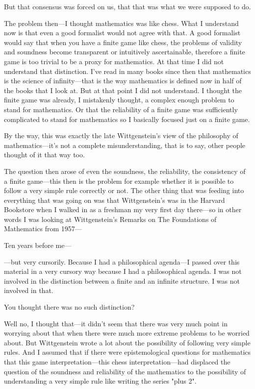  But that consensus was forced on us, that that was what we 
were supposed to do. 

 The problem then---I thought mathematics was like chess. 
What I understand now is that even a good formalist would not agree 
with that. A good formalist would say that when you have a finite game 
like chess, the problems of validity and soundness become transparent 
or intuitively ascertainable, therefore a finite game is too trivial to be a
proxy for mathematics. At that time I did not understand that distinction. 
I've read in many books since then that mathematics is the science 
of infinity---that is the way mathematics is defined now in half of the 
books that I look at. But at that point I did not understand. I thought 
the finite game was already, I mistakenly thought, a complex enough 
problem to stand for mathematics. Or that the reliability of a finite 
game was sufficiently complicated to stand for mathematics so I basically 
focused just on a finite game. 

 By the way, this was exactly the late Wittgenstein's view of 
the philosophy of mathematics---it's not a complete misunderstanding, 
that is to say, other people thought of it that way too. 

 The question then arose of even the soundness, the reliability, 
the consistency of a finite game---this then is the problem for example 
whether it is possible to follow a very simple rule correctly or not. The 
other thing that was feeding into everything that was going on was that 
Wittgenstein's  was in 
the Harvard Bookstore when I walked in as a freshman my very first 
day there---so in other words I was looking at Wittgenstein's Remarks 
on The Foundations of Mathematics from 1957--- 

 Ten years before me--- 

 ---but very cursorily. Because I had a philosophical 
agenda---I passed over this material in a very cursory way because I had a 
philosophical agenda. I was not involved in the distinction between a 
finite and an infinite structure. I was not involved in that. 

 You thought there was no such distinction? 

 Well no, I thought that---it didn't seem that there was very 
much point in worrying about that when there were much more 
extreme problems to be worried about. But Wittgenstein wrote a lot 
about the possibility of following very simple rules. And I assumed that 
if there were epistemological questions for mathematics that this game 
interpretation---this chess interpretation---had displaced the question 
of the soundness and reliability of the mathematics to the possibility of 
understanding a very simple rule like writing the series "plus 2". 

